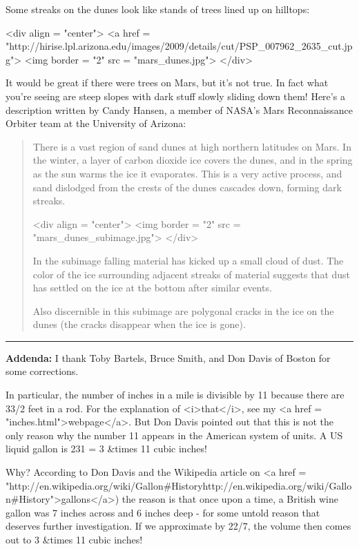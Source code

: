 Some streaks on the dunes look like stands of trees lined up on hilltops: 

<div align = "center">
<a href = "http://hirise.lpl.arizona.edu/images/2009/details/cut/PSP_007962_2635_cut.jpg">
<img border = "2" src = "mars_dunes.jpg">
</div>

It would be great if there were trees on Mars, but it's not true.  In
fact what you're seeing are steep slopes with dark stuff slowly
sliding down them!  Here's a description written by Candy Hansen, a
member of NASA's Mars Reconnaissance Orbiter team at the University of
Arizona:

\begin{quote}

There is a vast region of sand dunes at high northern latitudes on
Mars. In the winter, a layer of carbon dioxide ice covers the dunes,
and in the spring as the sun warms the ice it evaporates. This is a
very active process, and sand dislodged from the crests of the dunes
cascades down, forming dark streaks.

<div align = "center">
<img border = "2" src = "mars_dunes_subimage.jpg">
</div>

In the subimage falling material has kicked up a small cloud of
dust. The color of the ice surrounding adjacent streaks of material
suggests that dust has settled on the ice at the bottom after similar
events.

Also discernible in this subimage are polygonal cracks in the ice on
the dunes (the cracks disappear when the ice is gone).

\end{quote}

\par\noindent\rule{\textwidth}{0.4pt}
\textbf{Addenda:} I thank Toby Bartels, Bruce Smith, and Don Davis of
Boston for some corrections.

In particular, the number of inches in a mile is divisible by 11
because there are 33/2 feet in a rod.  For the explanation of
<i>that</i>, see my <a href = "inches.html">webpage</a>.  But Don
Davis pointed out that this is not the only reason why the number 11
appears in the American system of units.  A US liquid gallon is 231 =
3  &times 11 cubic inches!

Why?  According to Don Davis and the Wikipedia article on <a href =
"http://en.wikipedia.org/wiki/Gallon#Historyhttp://en.wikipedia.org/wiki/Gallon#History">gallons</a>)
the reason is that once upon a time, a British wine gallon was 7
inches across and 6 inches deep - for some untold reason that deserves
further investigation.  If we approximate \pi  by 22/7, the volume
then comes out to 3  &times 11 cubic inches!

